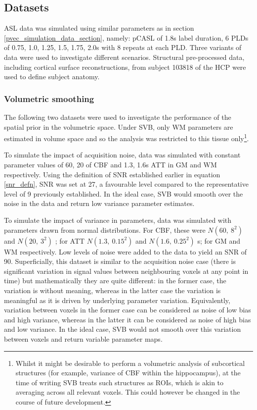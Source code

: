 \subsection{Datasets}

ASL data was simulated using similar parameters as in section \ref{pvec_simulation_data_section}, namely: pCASL of 1.8s label duration, 6 PLDs of 0.75, 1.0, 1.25, 1.5, 1.75, 2.0s with 8 repeats at each PLD. Three variants of data were used to investigate different scenarios. Structural pre-processed data, including cortical surface reconstructions, from subject 103818 of the HCP were used to define subject anatomy. 

\subsubsection{Volumetric smoothing}

The following two datasets were used to investigate the performance of the spatial prior in the volumetric space. Under SVB, only WM parameters are estimated in volume space and so the analysis was restricted to this tissue only\footnote{Whilst it might be desirable to perform a volumetric analysis of subcortical structures (for example, variance of CBF within the hippocampus), at the time of writing SVB treats such structures as ROIs, which is akin to averaging across all relevant voxels. This could however be changed in the course of future development.}.  

To simulate the impact of acquisition noise, data was simulated with constant parameter values of 60, 20 \cbf of CBF and 1.3, 1.6s ATT in GM and WM respectively. Using the definition of SNR established earlier in equation \ref{snr_defn}, SNR was set at 27, a favourable level compared to the representative level of 9 previously established. In the ideal case, SVB would smooth over the noise in the data and return low variance parameter estimates.

To simulate the impact of variance in parameters, data was simulated with parameters drawn from normal distributions. For CBF, these were $N(60,\ 8^2)$ and $N(20,\ 3^2)$ \cbf; for ATT $N(1.3,\ 0.15^2)$ and $N(1.6,\ 0.25^2)$ s; for GM and WM respectively. Low levels of noise were added to the data to yield an SNR of 90. Superficially, this dataset is similar to the acquisition noise case (there is significant variation in signal values between neighbouring voxels at any point in time) but mathematically they are quite different: in the former case, the variation is without meaning, whereas in the latter case the variation is meaningful as it is driven by underlying parameter variation. Equivalently, variation between voxels in the former case can be considered as noise of low bias and high variance, whereas in the latter it can be considered as noise of high bias and low variance. In the ideal case, SVB would not smooth over this variation between voxels and return variable parameter maps.


